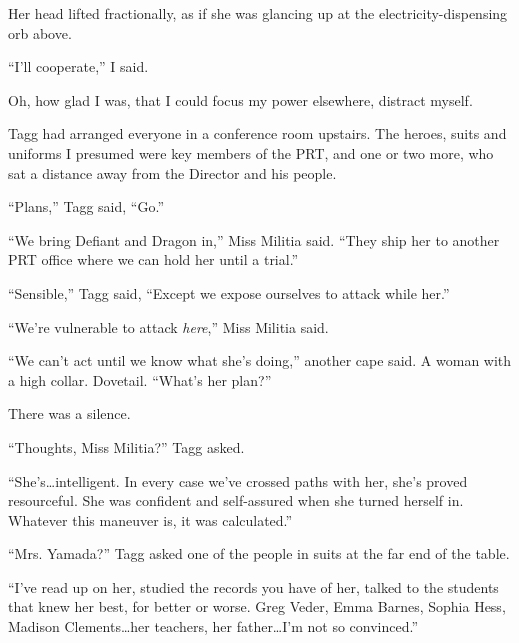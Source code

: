 Her head lifted fractionally, as if she was glancing up at the electricity-dispensing orb above.



``I'll cooperate,'' I said.



Oh, how glad I was, that I could focus my power elsewhere, distract myself.



Tagg had arranged everyone in a conference room upstairs.  The heroes, suits and uniforms I presumed were key members of the PRT, and one or two more, who sat a distance away from the Director and his people.



``Plans,'' Tagg said, ``Go.''



``We bring Defiant and Dragon in,'' Miss Militia said.  ``They ship her to another PRT office where we can hold her until a trial.''



``Sensible,'' Tagg said, ``Except we expose ourselves to attack while \ldotsing her.''



``We're vulnerable to attack \emph{here},'' Miss Militia said.



``We can't act until we know what she's doing,'' another cape said.  A woman with a high collar.  Dovetail.  ``What's her plan?''



There was a silence.



``Thoughts, Miss Militia?'' Tagg asked.



``She's\ldots intelligent.  In every case we've crossed paths with her, she's proved resourceful.  She was confident and self-assured when she turned herself in.  Whatever this maneuver is, it was calculated.''



``Mrs. Yamada?'' Tagg asked one of the people in suits at the far end of the table.



``I've read up on her, studied the records you have of her, talked to the students that knew her best, for better or worse.  Greg Veder, Emma Barnes, Sophia Hess, Madison Clements\ldots her teachers, her father\ldots I'm not so convinced.''



